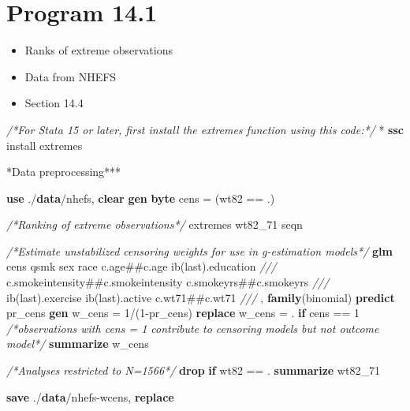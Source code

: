 \documentclass[
  10pt,
]{book}
\newenvironment{Shaded}{\begin{snugshade}}{\end{snugshade}}
\newcommand{\CommentTok}[1]{\textcolor[rgb]{0.56,0.35,0.01}{\textit{#1}}}
\newcommand{\FunctionTok}[1]{\textcolor[rgb]{0.00,0.00,0.00}{#1}}
\newcommand{\KeywordTok}[1]{\textcolor[rgb]{0.13,0.29,0.53}{\textbf{#1}}}
\newcommand{\NormalTok}[1]{#1}
\providecommand{\tightlist}{%
  \setlength{\itemsep}{0pt}\setlength{\parskip}{0pt}}
\begin{document}
\hypertarget{program-14.1-1}{%
\section{Program 14.1}\label{program-14.1-1}}

\begin{itemize}
\tightlist
\item
  Ranks of extreme observations
\item
  Data from NHEFS
\item
  Section 14.4
\end{itemize}

\begin{Shaded}
\begin{Highlighting}[]
\CommentTok{/*For Stata 15 or later, first install the extremes function using this code:*/}
\NormalTok{* }\KeywordTok{ssc}\NormalTok{ install extremes }

\NormalTok{*Data preprocessing***}

\KeywordTok{use}\NormalTok{ ./}\KeywordTok{data}\NormalTok{/nhefs, }\KeywordTok{clear}
\KeywordTok{gen} \KeywordTok{byte}\NormalTok{ cens = (wt82 == .)}

\CommentTok{/*Ranking of extreme observations*/}
\NormalTok{extremes wt82\_71 seqn}

\CommentTok{/*Estimate unstabilized censoring weights for use in g{-}estimation models*/}
\KeywordTok{glm}\NormalTok{ cens qsmk sex race c.age\#\#c.age ib(}\FunctionTok{last}\NormalTok{).education }\CommentTok{///}
\NormalTok{  c.smokeintensity\#\#c.smokeintensity c.smokeyrs\#\#c.smokeyrs }\CommentTok{///}
\NormalTok{  ib(}\FunctionTok{last}\NormalTok{).exercise ib(}\FunctionTok{last}\NormalTok{).active c.wt71\#\#c.wt71 }\CommentTok{///}
\NormalTok{  , }\KeywordTok{family}\NormalTok{(binomial)}
\KeywordTok{predict}\NormalTok{ pr\_cens}
\KeywordTok{gen}\NormalTok{ w\_cens = 1/(1{-}pr\_cens)}
\KeywordTok{replace}\NormalTok{ w\_cens = . }\KeywordTok{if}\NormalTok{ cens == 1 }\CommentTok{/*observations with cens = 1 contribute to censoring models but not outcome model*/}
\KeywordTok{summarize}\NormalTok{ w\_cens}

\CommentTok{/*Analyses restricted to N=1566*/}
\KeywordTok{drop} \KeywordTok{if}\NormalTok{ wt82 == .}
\KeywordTok{summarize}\NormalTok{ wt82\_71}

\KeywordTok{save}\NormalTok{ ./}\KeywordTok{data}\NormalTok{/nhefs{-}wcens, }\KeywordTok{replace}
\end{Highlighting}
\end{Shaded}
\end{document}
